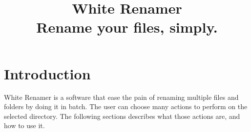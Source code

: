 \documentclass[11pt, a4paper]{scrartcl}
\title{\color{white}\Huge\textsf{White Renamer}\\[1.5cm]
\large\textsf{Rename your files, simply.}}
\date{}
\author{}
\newcommand{\HRule}[1]{\rule{\linewidth}{#1}} 	%
\begin{document}
\setlength{\parindent}{0pt}
\restoregeometry %
\nopagecolor%
\renewcommand{\labelitemi}{$\bullet$}
\section{Introduction}
White Renamer is a software that ease the pain of renaming multiple files and folders by doing it in batch. The user can choose many actions to perform on the selected directory. The following sections describes what those actions are, and how to use it.
\end{document}
